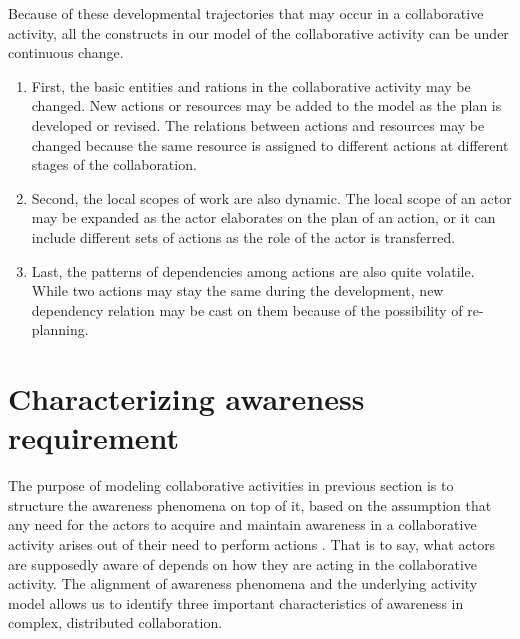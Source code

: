 Because of these developmental trajectories that may occur in a collaborative activity, all the constructs in our model of the collaborative activity can be under continuous change. 
\begin{enumerate}
	\item First, the basic entities and rations in the collaborative activity may be changed. New actions or resources may be added to the model as the plan is developed or revised. The relations between actions and resources may be changed because the same resource is assigned to different actions at different stages of the collaboration.
	\item Second, the local scopes of work are also dynamic.  The local scope of an actor may be expanded as the actor elaborates on the plan of an action, or it can include different sets of actions as the role of the actor is transferred.
	\item Last, the patterns of dependencies among actions are also quite volatile. While two actions may stay the same during the development, new dependency relation may be cast on them because of the possibility of re-planning.
\end{enumerate}

\section{Characterizing awareness requirement} %
\label{sec:awareness_requirements}
The purpose of modeling collaborative activities in previous section is to structure the awareness phenomena on top of it, based on the assumption that any need for the actors to acquire and maintain awareness in a collaborative activity arises out of their need to perform actions \cite{schmidt2002a}. That is to say, what actors are supposedly aware of depends on how they are acting in the collaborative activity. The alignment of awareness phenomena and the underlying activity model allows us to identify three important characteristics of awareness in complex, distributed collaboration.

